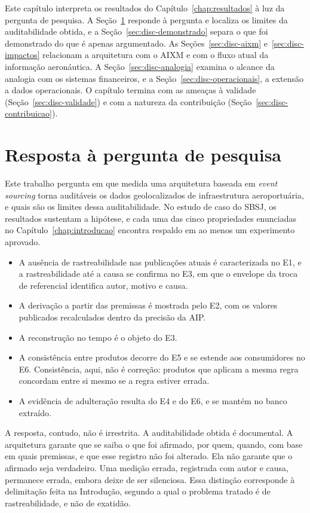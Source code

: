 Este capítulo interpreta os resultados do Capítulo~\ref{chap:resultados} à luz da pergunta de pesquisa. A Seção~\ref{sec:disc-resposta} responde à pergunta e localiza os limites da auditabilidade obtida, e a Seção~\ref{sec:disc-demonstrado} separa o que foi demonstrado do que é apenas argumentado. As Seções~\ref{sec:disc-aixm} e~\ref{sec:disc-impactos} relacionam a arquitetura com o AIXM e com o fluxo atual da informação aeronáutica. A Seção~\ref{sec:disc-analogia} examina o alcance da analogia com os sistemas financeiros, e a Seção~\ref{sec:disc-operacionais}, a extensão a dados operacionais. O capítulo termina com as ameaças à validade (Seção~\ref{sec:disc-validade}) e com a natureza da contribuição (Seção~\ref{sec:disc-contribuicao}).

\section{Resposta à pergunta de pesquisa}\label{sec:disc-resposta}

Este trabalho pergunta em que medida uma arquitetura baseada em \textit{event sourcing} torna auditáveis os dados geolocalizados de infraestrutura aeroportuária, e quais são os limites dessa auditabilidade. No estudo de caso do SBSJ, os resultados sustentam a hipótese, e cada uma das cinco propriedades enunciadas no Capítulo~\ref{chap:introducao} encontra respaldo em ao menos um experimento aprovado.
\begin{itemize}
    \item A ausência de rastreabilidade nas publicações atuais é caracterizada no E1, e a rastreabilidade até a causa se confirma no E3, em que o envelope da troca de referencial identifica autor, motivo e causa.
    \item A derivação a partir das premissas é mostrada pelo E2, com os valores publicados recalculados dentro da precisão da AIP.
    \item A reconstrução no tempo é o objeto do E3.
    \item A consistência entre produtos decorre do E5 e se estende aos consumidores no E6. Consistência, aqui, não é correção: produtos que aplicam a mesma regra concordam entre si mesmo se a regra estiver errada.
    \item A evidência de adulteração resulta do E4 e do E6, e se mantém no banco extraído.
\end{itemize}

A resposta, contudo, não é irrestrita. A auditabilidade obtida é documental. A arquitetura garante que se saiba o que foi afirmado, por quem, quando, com base em quais premissas, e que esse registro não foi alterado. Ela não garante que o afirmado seja verdadeiro. Uma medição errada, registrada com autor e causa, permanece errada, embora deixe de ser silenciosa. Essa distinção corresponde à delimitação feita na Introdução, segundo a qual o problema tratado é de rastreabilidade, e não de exatidão.

